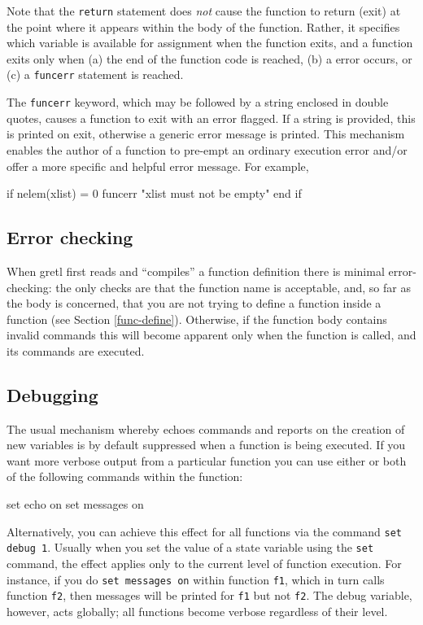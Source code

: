 Note that the \verb+return+ statement does \emph{not} cause the
function to return (exit) at the point where it appears within the
body of the function. Rather, it specifies which variable is available
for assignment when the function exits, and a function exits only when
(a) the end of the function code is reached, (b) a  error
occurs, or (c) a \verb+funcerr+ statement is reached.

The \verb+funcerr+ keyword, which may be followed by a string enclosed
in double quotes, causes a function to exit with an error flagged.  If
a string is provided, this is printed on exit, otherwise a generic
error message is printed.  This mechanism enables the author of a
function to pre-empt an ordinary execution error and/or offer a more
specific and helpful error message.  For example,
%
\begin{code}
if nelem(xlist) = 0
   funcerr "xlist must not be empty"
end if
\end{code}
    

\subsection{Error checking}

When gretl first reads and ``compiles'' a function definition there is
minimal error-checking: the only checks are that the function name is
acceptable, and, so far as the body is concerned, that you are not
trying to define a function inside a function (see Section
\ref{func-define}). Otherwise, if the function body contains invalid
commands this will become apparent only when the function is called,
and its commands are executed.

\subsection{Debugging}

The usual mechanism whereby  echoes commands and reports on
the creation of new variables is by default suppressed when a function
is being executed.  If you want more verbose output from a particular
function you can use either or both of the following commands within
the function:
%
\begin{code}
set echo on
set messages on
\end{code}

Alternatively, you can achieve this effect for all functions via
the command \texttt{set debug 1}.  Usually when you set the value of a
state variable using the \texttt{set} command, the effect applies only
to the current level of function execution.  For instance, if you do
\texttt{set messages on} within function \texttt{f1}, which in turn
calls function \texttt{f2}, then messages will be printed for
\texttt{f1} but not \texttt{f2}.  The debug variable, however, acts
globally; all functions become verbose regardless of their level.

